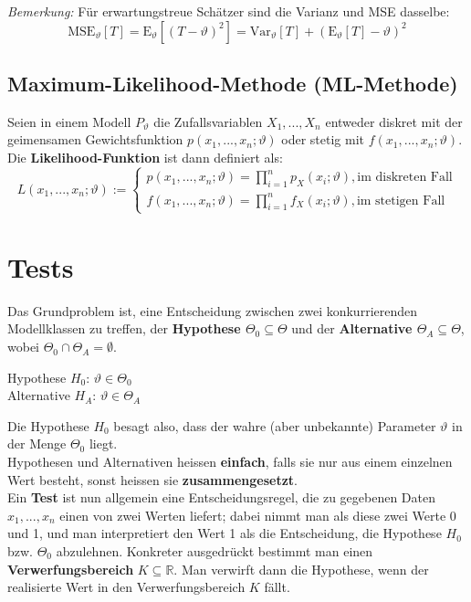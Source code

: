 \documentclass[11pt]{article}
\newcommand{\E}{\text{E}}
\newcommand{\Var}{\text{Var}}
\newcommand{\MSE}{\text{MSE}}
\begin{document}
\emph{Bemerkung:} F{\"u}r erwartungstreue Sch{\"a}tzer sind die Varianz und MSE dasselbe:
\begin{equation*}
	\MSE_\vartheta[T] = \E_\vartheta[(T-\vartheta)^2] = \Var_\vartheta[T] + (\E_\vartheta[T] - \vartheta)^2
\end{equation*}

\subsection{Maximum-Likelihood-Methode (ML-Methode)}

Seien in einem Modell $P_\vartheta$ die Zufallsvariablen $X_1,...,X_n$ entweder diskret mit der geimensamen Gewichtsfunktion $p(x_1,...,x_n;\vartheta)$ oder stetig mit $f(x_1,...,x_n;\vartheta)$. Die \textbf{Likelihood-Funktion} ist dann definiert als:
\begin{equation*}
	L(x_1,...,x_n;\vartheta) := \begin{cases}
		p(x_1,...,x_n; \vartheta) = \prod_{i=1}^n p_X(x_i; \vartheta), \text{im diskreten Fall} \\
		f(x_1,...,x_n; \vartheta) = \prod_{i=1}^n f_X(x_i; \vartheta), \text{im stetigen Fall}
	\end{cases}
\end{equation*}

\section{Tests}

Das Grundproblem ist, eine Entscheidung zwischen zwei konkurrierenden Modellklassen zu treffen, der \textbf{Hypothese $\Theta_0 \subseteq \Theta$} und der \textbf{Alternative $\Theta_A \subseteq \Theta$}, wobei $\Theta_0 \cap \Theta_A = \emptyset$.

\begin{center}
	Hypothese $H_0$: $\vartheta \in \Theta_0$ \\
	Alternative $H_A$: $\vartheta \in \Theta_A$
\end{center}

Die Hypothese $H_0$ besagt also, dass der wahre (aber unbekannte) Parameter $\vartheta$ in der Menge $\Theta_0$ liegt. \\
Hypothesen und Alternativen heissen \textbf{einfach}, falls sie nur aus einem einzelnen Wert besteht, sonst heissen sie \textbf{zusammengesetzt}. \\

Ein \textbf{Test} ist nun allgemein eine Entscheidungsregel, die zu gegebenen Daten $x_1,...,x_n$ einen von zwei Werten liefert; dabei nimmt man als diese zwei Werte 0 und 1, und man interpretiert den Wert 1 als die Entscheidung, die Hypothese $H_0$ bzw. $\Theta_0$ abzulehnen. Konkreter ausgedr{\"u}ckt bestimmt man einen \textbf{Verwerfungsbereich} $K \subseteq \mathbb{R}$. Man verwirft dann die Hypothese, wenn der realisierte Wert in den Verwerfungsbereich $K$ f{\"a}llt. \\
\end{document}
